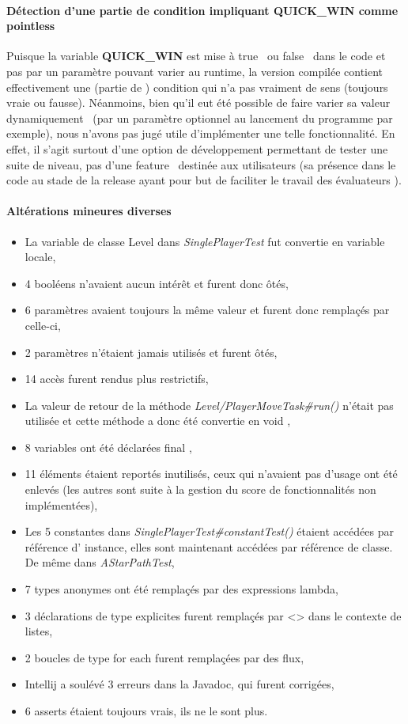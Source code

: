 \documentclass[12pt, openany]{report}
\begin{document}
\paragraph{Détection d'une partie de condition impliquant QUICK\_WIN comme \og pointless \fg} 
Puisque la variable \textbf{QUICK\_WIN} est mise à \og true \fg \, ou \og false \fg \, dans le code et pas par un paramètre pouvant varier au runtime, la version compilée contient effectivement une (partie de ) condition qui n'a pas vraiment de sens (toujours vraie ou fausse).
Néanmoins, bien qu'il eut été possible de faire varier sa valeur \og dynamiquement \fg \, (par un paramètre optionnel au lancement du programme par exemple), nous n'avons pas jugé utile d'implémenter une telle fonctionnalité. En effet, il s'agit surtout d'une option de développement permettant de tester une suite de niveau, pas d'une \og feature \fg \, destinée aux utilisateurs (sa présence dans le code au stade de la release ayant pour but de faciliter le travail des \og évaluateurs \fg).
\paragraph{Altérations mineures diverses}

\begin{itemize}
	\item La variable de classe \og Level \fg{} dans \mbox{\textit{SinglePlayerTest}} fut convertie en variable locale,
	\item 4 booléens n'avaient aucun intérêt et furent donc ôtés,
	\item 6 paramètres avaient toujours la même valeur et furent donc remplaçés par celle-ci,
	\item 2 paramètres n'étaient jamais utilisés et furent ôtés,
	\item 14 accès furent rendus plus restrictifs,
	\item La valeur de retour de la méthode \mbox{\textit{Level/PlayerMoveTask\#run()}} n'était pas utilisée et cette méthode a donc été convertie en \og void \fg{},
	\item 8 variables ont été déclarées \og final \fg{},
	\item 11 éléments étaient reportés inutilisés, ceux qui n'avaient pas d'usage ont été enlevés (les autres sont suite à la gestion du score de fonctionnalités non implémentées),
	\item Les 5 constantes dans \mbox{\textit{SinglePlayerTest\#constantTest()}} étaient accédées par référence d' instance, elles sont maintenant accédées par référence de classe. De même dans \mbox{\textit{AStarPathTest}},
	\item 7 types anonymes ont été remplaçés par des expressions lambda,
	\item 3 déclarations de type explicites furent remplaçés par \og <> \fg{} dans le contexte de listes,
	\item 2 boucles de type \og for each \fg{} furent remplaçées par des flux,
	\item Intellij a soulévé 3 erreurs dans la Javadoc, qui furent corrigées,
	\item 6 \og asserts \fg{} étaient toujours vrais, ils ne le sont plus.
\end{itemize}
\end{document}
